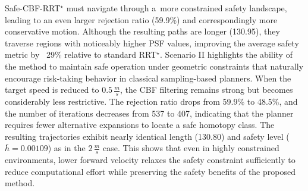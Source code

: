\documentclass{svproc}
\begin{document}
Safe-CBF-RRT$^\star$ must navigate through a~more constrained safety landscape,
leading to an even larger rejection ratio (59.9\%) and correspondingly more
conservative motion. Although the resulting paths are longer (130.95), they
traverse regions with noticeably higher PSF values, improving the average safety
metric by ~29\% relative to standard RRT$^\star$.
Scenario II highlights the ability of the method to maintain safe operation
under geometric constraints that naturally encourage risk-taking behavior
in classical sampling-based planners.
When the target speed is reduced to $0.5\,\frac{m}{s}$, the CBF filtering
remains strong but becomes considerably less restrictive. The rejection ratio
drops from 59.9\% to 48.5\%, and the number of iterations decreases from 537 to
407, indicating that the planner requires fewer alternative expansions to locate
a safe homotopy class. The resulting trajectories exhibit nearly identical
length (130.80) and safety level ($\bar h=0.00109$) as in the
$2\,\frac{m}{s}$ case. This shows that even in highly constrained environments,
lower forward velocity relaxes the safety constraint sufficiently to reduce
computational effort while preserving the safety benefits of the proposed
method.
\end{document}
